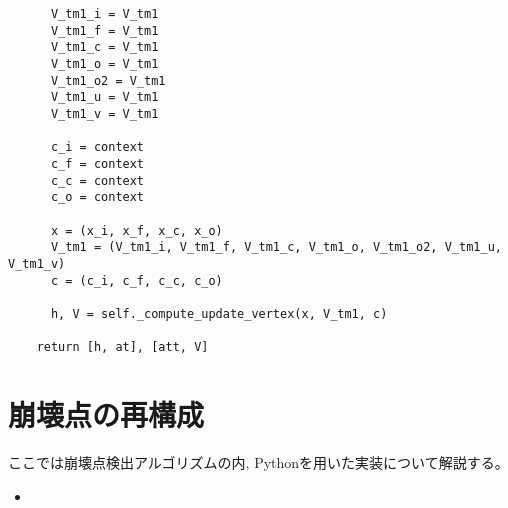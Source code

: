 \begin{lstlisting}
      V_tm1_i = V_tm1
      V_tm1_f = V_tm1
      V_tm1_c = V_tm1
      V_tm1_o = V_tm1
      V_tm1_o2 = V_tm1
      V_tm1_u = V_tm1
      V_tm1_v = V_tm1

      c_i = context
      c_f = context
      c_c = context
      c_o = context

      x = (x_i, x_f, x_c, x_o)
      V_tm1 = (V_tm1_i, V_tm1_f, V_tm1_c, V_tm1_o, V_tm1_o2, V_tm1_u, V_tm1_v)
      c = (c_i, c_f, c_c, c_o)

      h, V = self._compute_update_vertex(x, V_tm1, c)

    return [h, at], [att, V]
\end{lstlisting}

\section{崩壊点の再構成} \label{sec:CodePairProduction}

ここでは崩壊点検出アルゴリズムの内, Pythonを用いた実装について解説する。

\begin{itemize}
 \item
\end{itemize}

